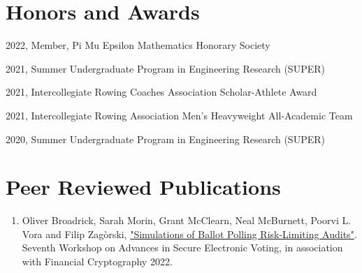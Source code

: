 \documentclass[letterpaper]{article}
\renewenvironment{itemize}{
  \begin{list}{}{
    \setlength{\leftmargin}{1.5em}
  }
}{
  \end{list}
}
\begin{document}
\section*{Honors and Awards}

\begin{itemize}
\item 2022, Member, Pi Mu Epsilon Mathematics Honorary Society
\item 2021, Summer Undergraduate Program in Engineering Research (SUPER)
\item 2021, Intercollegiate Rowing Coaches Association Scholar-Athlete Award
\item 2021, Intercollegiate Rowing Association Men's Heavyweight All-Academic Team
\item 2020, Summer Undergraduate Program in Engineering Research (SUPER)
\end{itemize}


\section*{Peer Reviewed Publications}

\begin{enumerate}

\item Oliver Broadrick, Sarah Morin, Grant McClearn, Neal McBurnett, Poorvi L. Vora and Filip Zag\`{o}rski, \href{https://oliverbroadrick.com/papers/simulations-of-ballot-polling-rlas.pdf}{"Simulations of Ballot Polling Risk-Limiting Audits"}. Seventh Workshop on Advances in Secure Electronic Voting, in association with Financial Cryptography 2022.

\end{enumerate}

\bigskip
\end{document}
